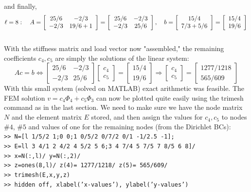 \documentclass[../main.tex]{subfiles}
\begin{document}
and finally,
\\
$$
\ell=8: \quad A=\left[\begin{array}{cc}
25 / 6 & -2 / 3 \\
-2 / 3 & 19 / 6+1
\end{array}\right]=\left[\begin{array}{cc}
25 / 6 & -2 / 3 \\
-2 / 3 & 25 / 6
\end{array}\right], \quad b=\left[\begin{array}{c}
15 / 4 \\
7 / 3+5 / 6
\end{array}\right]=\left[\begin{array}{l}
15 / 4 \\
19 / 6
\end{array}\right]\\
$$
\\
With the stiffness matrix and load vector now "assembled," the remaining coefficients $c_{4}, c_{5}$ are simply the solutions of the linear system:
$$
A c=b \Leftrightarrow\left[\begin{array}{ll}
25 / 6 & -2 / 3 \\
-2 / 3 & 25 / 6
\end{array}\right]\left[\begin{array}{l}
c_{4} \\
c_{5}
\end{array}\right]=\left[\begin{array}{l}
15 / 4 \\
19 / 6
\end{array}\right] \Rightarrow\left[\begin{array}{l}
c_{4} \\
c_{5}
\end{array}\right]=\left[\begin{array}{c}
1277 / 1218 \\
565 / 609
\end{array}\right]
$$
With this small system (solved on MATLAB) exact arithmetic was feasible. The FEM solution $v=c_{4} \Phi_{4}+c_{5} \Phi_{3}$ can now be plotted quite easily using the trimesh command as in the last section. We need to make sure we have the node matrix $N$ and the element matrix $E$ stored, and then assign the values for $c_{4}, c_{5}$ to nodes $\#4$, $\#5$ and values of one for the remaining nodes (from the Dirichlet BCs):
\\
\texttt{>> N=[l 1/5/2 1;0 0;1 0/5/2 0/7/2 0/1 -1/2.5 -1];\\
>> E=ll 3 4/1 2 4/2 4 5/2 5 6;3 4 7/4 5 7/5 7 8/5 6 8]/\\
>> x=N(:,l)/ y=N(:,2)/ \\
>> z=ones(8,l)/ z(4)= 1277/1218/ z(5)= 565/609/ \\
>> trimesh(E,x,y,z) \\
>> hidden off, xlabel('x-values'), ylabel('y-values')}
\end{document}
